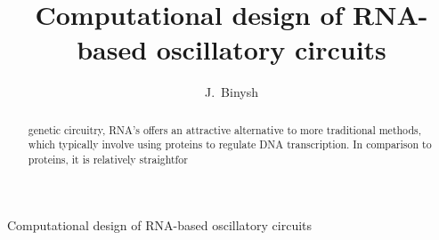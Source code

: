 \documentclass[10pt,journal]{./IEEE_latex_class/IEEEtran}
\begin{document}
%
\title{Computational design of RNA-based oscillatory circuits}

\author{J.~Binysh
        \\ }

%
{Computational design of RNA-based oscillatory circuits}

\maketitle

\thispagestyle{empty}

\newcommand{\MYheader}{\smash{\scriptsize

\hfil\parbox[t][\height][t]{\textwidth}{\centering {\normalsize
Place conference title here}}\hfil\hbox{}}}
\makeatletter

\if@twoside
  \def\ps@headings{%
      \let\@oddfoot\@empty\let\@evenfoot\@empty
      \def\@evenhead{\small\thepage\hfil\leftmark\strut\vadjust{\vskip .1ex\hrule}}%
      \def\@oddhead{\small\rightmark\hfil\thepage\strut\vadjust{\vskip .1ex\hrule}}%
      \let\@mkboth\markboth
    \def\chaptermark##1{%
      \markboth{\scshape%
        \ifnum \c@secnumdepth >\m@ne
            \@chapapp\ \thechapter. \ %
        \fi
        ##1}{}}%
    \def\sectionmark##1{%
      \markright{\scshape%
        \ifnum \c@secnumdepth >\z@
          \thesection. \ %
        \fi
        ##1}}}
\else
  \def\ps@headings{%
    \let\@oddfoot\@empty
    \def\@oddhead{{\slshape\rightmark}\hfil\thepage\ of\ \pageref{LastPage} \strut\vadjust{\vskip .1ex\hrule}}%
    \let\@mkboth\markboth
    \def\chaptermark##1{%
      \markright{\scshape%
        \ifnum \c@secnumdepth >\m@ne
            \@chapapp\ \thechapter. \ %
        \fi
        ##1}}}
\fi
\makeatother

\makeatother

\pagestyle{headings}

\begin{abstract}
genetic circuitry, RNA's offers an attractive alternative to more traditional methods, which typically involve using proteins to regulate DNA transcription. In comparison to proteins, it is relatively straightfor
\end{abstract}
\end{document}
